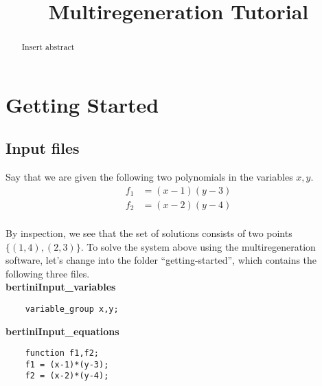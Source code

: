 \documentclass[12pt]{article}
\title{\large \bf
Multiregeneration Tutorial
}
\author{}
\theoremstyle{definition}
\newcommand{\C}{\mathbb{C}}
\newcommand{\red}[1]{{\color{red}#1}}
\begin{document}
\maketitle
\begin{abstract} 
\red{Insert abstract}
\end{abstract}

\section{Getting Started}
\subsection{Input files}
Say that we are given the following two polynomials
in the variables $x,y$. 
\begin{align*}
    f_1 &= (x-1)(y-3)\\
    f_2 &= (x-2)(y-4)\\
\end{align*}

\noindent 
By inspection, we see that the set of solutions consists of two points $\{ (1,4), (2,3)\}$.
To solve the system above using the multiregeneration software, let's change into the folder 
``getting-started'', which contains the following three files.\\

\noindent \textbf{bertiniInput\_variables}


\begin{leftbar}
\vspace{-10pt} 
\begin{verbatim}
    variable_group x,y; 
\end{verbatim}\vspace{-10pt} 
\end{leftbar}

\noindent \textbf{bertiniInput\_equations}


\begin{leftbar}
\vspace{-10pt} 
\begin{verbatim}
    function f1,f2;
    f1 = (x-1)*(y-3);
    f2 = (x-2)*(y-4);
\end{verbatim}\vspace{-10pt} 
\end{leftbar}
\end{document}
